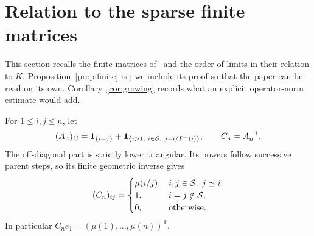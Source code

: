 \section{Relation to the sparse finite matrices}\label{sec:finite}
This section recalls the finite matrices of~\cite{Kline} and the order of
limits in their relation to $K$. Proposition~\ref{prop:finite} is
\cite[Theorem~4.3]{Kline}; we include its proof so that the paper can be
read on its own. Corollary~\ref{cor:growing} records what an explicit
operator-norm estimate would add.

For $1\le i,j\le n$, let
\[
 (A_n)_{ij}=\mathbf 1_{\{i=j\}}+
 \mathbf 1_{\{i>1,\ i\in\mathcal S,\ j=i/P^+(i)\}},
 \qquad C_n=A_n^{-1}.
\]
The off-diagonal part is strictly lower triangular. Its powers follow
successive parent steps, so its finite geometric inverse gives
\begin{equation}\label{eq:Centries}
 (C_n)_{ij}=
 \begin{cases}
 \mu(i/j),&i,j\in\mathcal S,\ j\preceq i,\\
 1,&i=j\notin\mathcal S,\\
 0,&\text{otherwise}.
 \end{cases}
\end{equation}
In particular $C_ne_1=(\mu(1),\ldots,\mu(n))^{\mathsf T}$.

